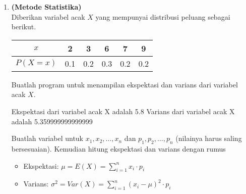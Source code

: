 \documentclass{article}
\begin{document}
\begin{enumerate}[label=\textbf{\arabic*.}]
        \item \textbf{(Metode Statistika)}\\
        Diberikan variabel acak $X$ yang mempunyai distribusi peluang sebagai berikut.
        \begin{center}
            \begin{tabular}{|c|c|c|c|c|c|}
                \hline
                $x$ & 2 & 3 & 6 & 7 & 9\\
                \hline
                $P(X=x)$ & 0.1 & 0.2 & 0.3 & 0.2 & 0.2\\
                \hline
            \end{tabular}
        \end{center}
        Buatlah program untuk menampilan ekspektasi dan varians dari variabel acak $X$.
        \begin{RunCode}{}
Ekspektasi dari variabel acak X adalah 5.8
Varians dari variabel acak X adalah 5.359999999999999
        \end{RunCode}
        \begin{hint}[]{}
            Buatlah variabel untuk $x_1, x_2, \ldots, x_n$ dan $p_1, p_2, \ldots, p_n$ (nilainya harus saling bersesuaian). Kemudian hitung ekspektasi dan varians dengan rumus
            \begin{itemize}
                \item Ekspektasi: $\mu = E(X) = \sum_{i=1}^{n} x_i \cdot p_i$
                \item Varians: $\sigma^2 = Var(X) = \sum_{i=1}^{n} (x_i - \mu)^2 \cdot p_i$
            \end{itemize}
        \end{hint}
    \end{enumerate}
\end{document}

